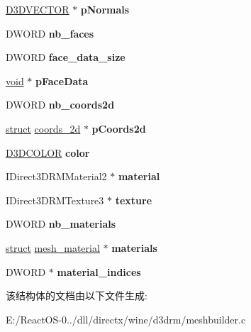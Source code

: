 \begin{DoxyCompactItemize}
\hyperlink{struct___d3_d_v_e_c_t_o_r}{D3\+D\+V\+E\+C\+T\+OR} $\ast$ {\bfseries p\+Normals}
\item 
\mbox{\label{structd3drm__mesh__builder_abd6e7420be5238f5e296476ae9d6fa0f}} 
D\+W\+O\+RD {\bfseries nb\+\_\+faces}
\item 
\mbox{\label{structd3drm__mesh__builder_a8178ac2254d1ced3499a0fcc43c2baa7}} 
D\+W\+O\+RD {\bfseries face\+\_\+data\+\_\+size}
\item 
\mbox{\label{structd3drm__mesh__builder_a827c5048ffb101821d8a10d48ef29275}} 
\hyperlink{interfacevoid}{void} $\ast$ {\bfseries p\+Face\+Data}
\item 
\mbox{\label{structd3drm__mesh__builder_afaa949a9716db24f68883205ed3fde0c}} 
D\+W\+O\+RD {\bfseries nb\+\_\+coords2d}
\item 
\mbox{\label{structd3drm__mesh__builder_afe94509fce8360c219785cc5dfd90be6}} 
\hyperlink{interfacestruct}{struct} \hyperlink{structcoords__2d}{coords\+\_\+2d} $\ast$ {\bfseries p\+Coords2d}
\item 
\mbox{\label{structd3drm__mesh__builder_af1617567dd30385e2d671f01eb0fa118}} 
\hyperlink{struct_d3_d_c_o_l_o_r}{D3\+D\+C\+O\+L\+OR} {\bfseries color}
\item 
\mbox{\label{structd3drm__mesh__builder_acdc8d472780116ee7983e109247e9479}} 
I\+Direct3\+D\+R\+M\+Material2 $\ast$ {\bfseries material}
\item 
\mbox{\label{structd3drm__mesh__builder_a110d4f5d28b82c6024b3e0abd7275f7d}} 
I\+Direct3\+D\+R\+M\+Texture3 $\ast$ {\bfseries texture}
\item 
\mbox{\label{structd3drm__mesh__builder_a77d9d98a91d8572e55f55795eed7447f}} 
D\+W\+O\+RD {\bfseries nb\+\_\+materials}
\item 
\mbox{\label{structd3drm__mesh__builder_a2243574ef962fb66d2260e0118de1992}} 
\hyperlink{interfacestruct}{struct} \hyperlink{structmesh__material}{mesh\+\_\+material} $\ast$ {\bfseries materials}
\item 
\mbox{\label{structd3drm__mesh__builder_ab7dc85f496c97378c49ace59c5be0b8d}} 
D\+W\+O\+RD $\ast$ {\bfseries material\+\_\+indices}
\end{DoxyCompactItemize}


该结构体的文档由以下文件生成\+:\begin{DoxyCompactItemize}
\item 
E\+:/\+React\+O\+S-\/0../dll/directx/wine/d3drm/meshbuilder.\+c\end{DoxyCompactItemize}
